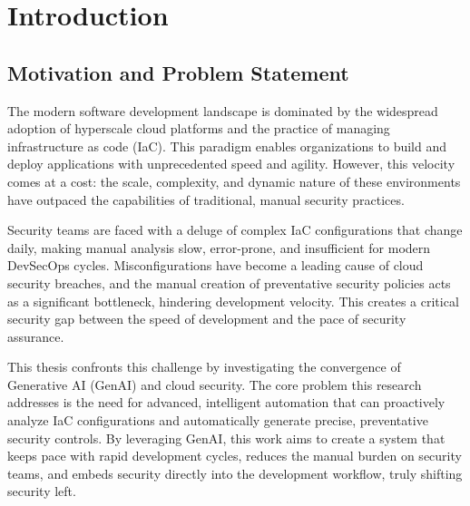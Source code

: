 
\chapter{Introduction}
\label{chap:introduction}


\newcommand{\keyword}[1]{\textbf{#1}}
\newcommand{\tabhead}[1]{\textbf{#1}}
\newcommand{\code}[1]{\texttt{#1}}
\newcommand{\file}[1]{\texttt{\bfseries#1}}
\newcommand{\option}[1]{\texttt{\itshape#1}}


\section{Motivation and Problem Statement}
\label{sec:motivation_problem}

The modern software development landscape is dominated by the widespread adoption of hyperscale cloud platforms and the practice of managing infrastructure as code (IaC). This paradigm enables organizations to build and deploy applications with unprecedented speed and agility. However, this velocity comes at a cost: the scale, complexity, and dynamic nature of these environments have outpaced the capabilities of traditional, manual security practices\cite{khanna_enhancing_2024}.

Security teams are faced with a deluge of complex IaC configurations that change daily, making manual analysis slow, error-prone, and insufficient for modern DevSecOps cycles\cite{gunathilaka_context-aware_2025}. Misconfigurations have become a leading cause of cloud security breaches, and the manual creation of preventative security policies acts as a significant bottleneck, hindering development velocity\cite{tunc_cloud_2017, fu_ai_2025}. This creates a critical security gap between the speed of development and the pace of security assurance.

This thesis confronts this challenge by investigating the convergence of Generative AI (GenAI) and cloud security. The core problem this research addresses is the need for advanced, intelligent automation that can proactively analyze IaC configurations and automatically generate precise, preventative security controls. By leveraging GenAI, this work aims to create a system that keeps pace with rapid development cycles, reduces the manual burden on security teams, and embeds security directly into the development workflow, truly shifting security left.

